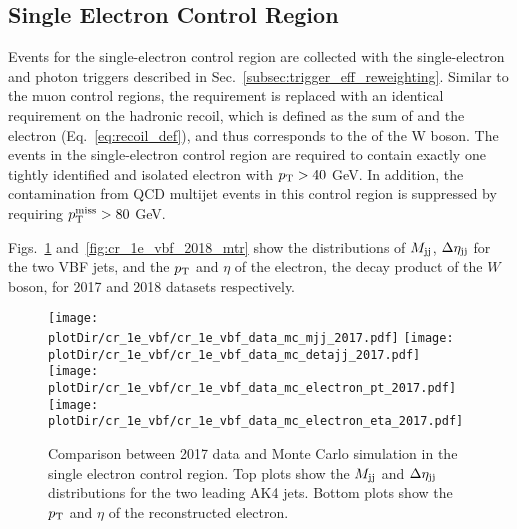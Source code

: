 \clearpage

\subsection{Single Electron Control Region}
\label{sec:selection_cr_1e}

Events for the single-electron control region are collected with the single-electron and photon triggers described in Sec.~\ref{subsec:trigger_eff_reweighting}.
Similar to the muon control regions, the \ptmiss requirement is replaced with an identical requirement on the hadronic recoil, which is defined as the sum of \ptvecmiss 
and the electron \vpt (Eq.~\ref{eq:recoil_def}), and thus corresponds to the \pt of the W boson.
The events in the single-electron control region are required to contain exactly one tightly identified and isolated electron with $p_{\textrm{T}} > 40$ GeV.
In addition, the contamination from QCD multijet events in this control region is suppressed by requiring $p_{\textrm{T}}^{\textrm{miss}} > 80$ GeV.

Figs.~\ref{fig:cr_1e_vbf_2017_mtr} and~\ref{fig:cr_1e_vbf_2018_mtr} show the distributions of $M_{\textrm{jj}}$, $\Delta \eta_{\textrm{jj}}$ for the two VBF jets,
and the $p_{\textrm{T}}$ and $\eta$ of the electron, the decay product of the $W$ boson, for 2017 and 2018 datasets respectively.

\begin{figure}[htbp]
    \begin{center}
        \texttt{[image: \\plotDir/cr\_1e\_vbf/cr\_1e\_vbf\_data\_mc\_mjj\_2017.pdf]}
        \texttt{[image: \\plotDir/cr\_1e\_vbf/cr\_1e\_vbf\_data\_mc\_detajj\_2017.pdf]} \\
        \texttt{[image: \\plotDir/cr\_1e\_vbf/cr\_1e\_vbf\_data\_mc\_electron\_pt\_2017.pdf]}
        \texttt{[image: \\plotDir/cr\_1e\_vbf/cr\_1e\_vbf\_data\_mc\_electron\_eta\_2017.pdf]}
    \end{center}
    \caption{Comparison between 2017 data and Monte Carlo simulation in the single electron control region. Top plots
    show the $M_{\textrm{jj}}$ and $\Delta \eta_{\textrm{jj}}$ distributions for the two leading AK4 jets. Bottom plots show the $p_{\textrm{T}}$ and $\eta$
    of the reconstructed electron.}
    \label{fig:cr_1e_vbf_2017_mtr}
\end{figure}

